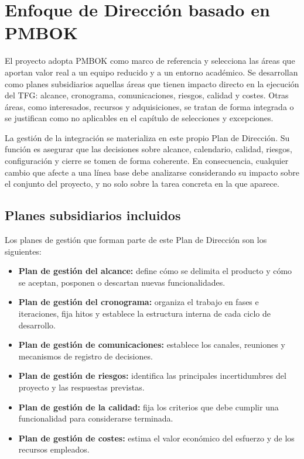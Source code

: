 \section{Enfoque de Dirección basado en PMBOK}
El proyecto adopta PMBOK como marco de referencia y selecciona las áreas que aportan valor
real a un equipo reducido y a un entorno académico. Se desarrollan como planes subsidiarios
aquellas áreas que tienen impacto directo en la ejecución del TFG: alcance, cronograma,
comunicaciones, riesgos, calidad y costes. Otras áreas, como interesados, recursos y
adquisiciones, se tratan de forma integrada o se justifican como no aplicables en el
capítulo de selecciones y excepciones.

La gestión de la integración se materializa en este propio Plan de Dirección. Su función es
asegurar que las decisiones sobre alcance, calendario, calidad, riesgos, configuración y
cierre se tomen de forma coherente. En consecuencia, cualquier cambio que afecte a una
línea base debe analizarse considerando su impacto sobre el conjunto del proyecto, y no solo
sobre la tarea concreta en la que aparece.

\subsection{Planes subsidiarios incluidos}
Los planes de gestión que forman parte de este Plan de Dirección son los siguientes:

\begin{itemize}
    \item \textbf{Plan de gestión del alcance:} define cómo se delimita el producto y cómo
    se aceptan, posponen o descartan nuevas funcionalidades.
    \item \textbf{Plan de gestión del cronograma:} organiza el trabajo en fases e
    iteraciones, fija hitos y establece la estructura interna de cada ciclo de desarrollo.
    \item \textbf{Plan de gestión de comunicaciones:} establece los canales, reuniones y
    mecanismos de registro de decisiones.
    \item \textbf{Plan de gestión de riesgos:} identifica las principales incertidumbres del
    proyecto y las respuestas previstas.
    \item \textbf{Plan de gestión de la calidad:} fija los criterios que debe cumplir una
    funcionalidad para considerarse terminada.
    \item \textbf{Plan de gestión de costes:} estima el valor económico del esfuerzo y de los
    recursos empleados.
\end{itemize}

